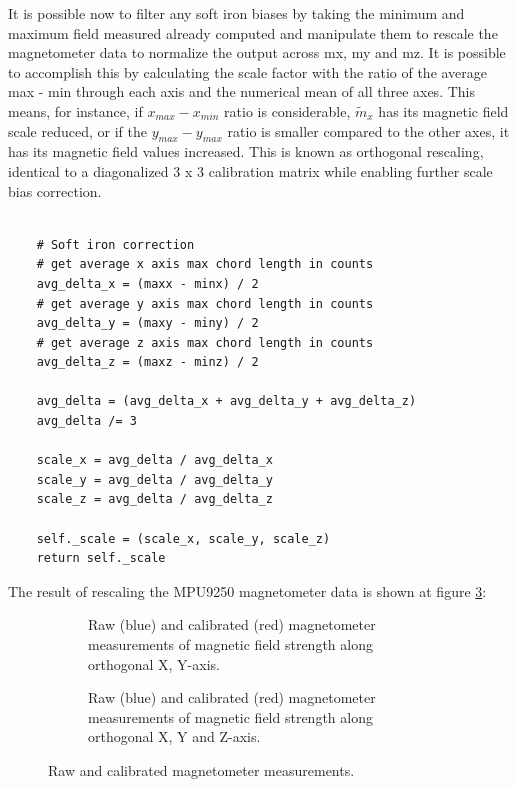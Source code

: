 It is possible now to filter any soft iron biases by taking the minimum and maximum field measured already computed and manipulate them to rescale the magnetometer data to normalize the output across mx, my and mz. It is possible to accomplish this by calculating the scale factor with the ratio of the average max - min through each axis and the numerical mean of all three axes. This means, for instance, if $x_{max} - x_{min}$ ratio is considerable, $\widetilde{m}_x$ has its magnetic field scale reduced, or if the $y_{max} - y_{max}$ ratio is smaller compared to the other axes, it has its magnetic field values increased. This is known as orthogonal rescaling, identical to a diagonalized 3 x 3 calibration matrix while enabling further scale bias correction.

\lstset{language=Python}
\begin{lstlisting}[frame=single]  % Start your code-block

    # Soft iron correction
    # get average x axis max chord length in counts
    avg_delta_x = (maxx - minx) / 2
    # get average y axis max chord length in counts
    avg_delta_y = (maxy - miny) / 2
    # get average z axis max chord length in counts
    avg_delta_z = (maxz - minz) / 2

    avg_delta = (avg_delta_x + avg_delta_y + avg_delta_z)
    avg_delta /= 3

    scale_x = avg_delta / avg_delta_x
    scale_y = avg_delta / avg_delta_y
    scale_z = avg_delta / avg_delta_z

    self._scale = (scale_x, scale_y, scale_z)
    return self._scale

\end{lstlisting}

The result of rescaling the MPU9250 magnetometer data is shown at figure \ref{fig:mag_calibration_output}:

\begin{figure}[!h]
  \centering
  \begin{subfigure}{0.49\textwidth}
    \centering
    \resizebox{1\linewidth}{!}{}
    \caption{Raw (blue) and calibrated (red) magnetometer measurements of magnetic field strength along orthogonal X, Y-axis.}
    \label{fig:magnetometer_calibrated2D}
  \end{subfigure}
  \begin{subfigure}{0.49\textwidth}
    \centering
    \resizebox{1\linewidth}{!}{}
    \caption{Raw (blue) and calibrated (red) magnetometer measurements of magnetic field strength along orthogonal X, Y and Z-axis.}
    \label{fig:magnetometer_calibrated3D}
  \end{subfigure}
  \caption{Raw and calibrated magnetometer measurements.}
  \label{fig:mag_calibration_output}
\end{figure}


